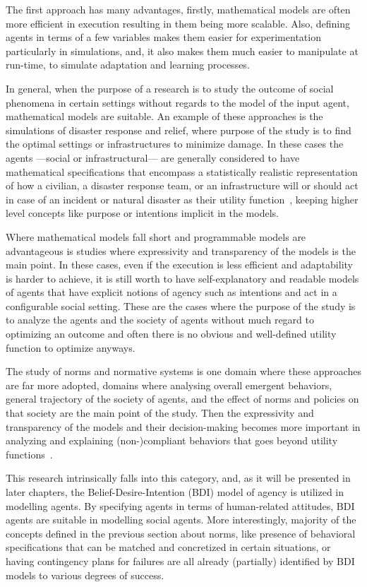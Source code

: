 The first approach has many advantages, firstly, mathematical models are often more efficient in execution resulting in them being more scalable. Also, defining agents in terms of a few variables makes them easier for experimentation particularly in simulations, and, it also makes them much easier to manipulate at run-time, to simulate adaptation and learning processes. 

In general, when the purpose of a research is to study the outcome of social phenomena in certain settings without regards to the model of the input agent, mathematical models are suitable. An example of these approaches is the simulations of disaster response and relief, where purpose of the study is to find the optimal settings or infrastructures to minimize damage. In these cases the agents ---social or infrastructural--- are generally considered to have mathematical specifications that encompass a statistically realistic representation of how a civilian, a disaster response team, or an infrastructure will or should act in case of an incident or natural disaster as their utility function~\cite{arinta2019disaster,khouj2011disaster,chamola2021disaster}, keeping higher level concepts like purpose or intentions implicit in the models.


Where mathematical models fall short and programmable models are advantageous is studies where expressivity and transparency of the models is the main point. In these cases, even if the execution is less efficient and adaptability is harder to achieve, it is still worth to have self-explanatory and readable models of agents that have explicit notions of agency such as intentions and act in a configurable social setting. These are the cases where the purpose of the study is to analyze the agents and the society of agents without much regard to optimizing an outcome and often there is no obvious and well-defined utility function to optimize anyways. 


The study of norms and normative systems is one domain where these approaches are far more adopted, domains where analysing overall emergent behaviors, general trajectory of the society of agents, and the effect of norms and policies on that society are the main point of the study. Then the expressivity and transparency of the models and their decision-making becomes more important in analyzing and explaining (non-)compliant behaviors that goes beyond utility functions~\cite{van2019governmental}. 

This research intrinsically falls into this category, and, as it will be presented in later chapters, the Belief-Desire-Intention (BDI) model of agency \cite{Rao1995} is utilized in modelling agents. By specifying agents in terms of human-related attitudes, BDI agents are suitable in modelling social agents. More interestingly, majority of the concepts defined in the previous section about norms, like presence of behavioral specifications that can be matched and concretized in certain situations, or having contingency plans for failures are all already (partially) identified by BDI models to various degrees of success.



